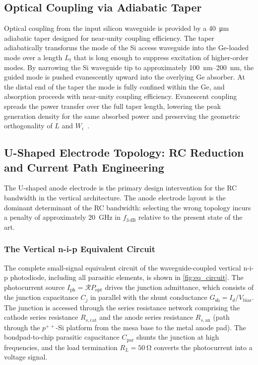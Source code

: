 \subsection[Optical Coupling via Adiabatic Taper]{Optical Coupling via Adiabatic Taper}
\label{subsec:pd_taper}

Optical coupling from the input silicon waveguide is provided by a
\SI{40}{\micro\metre} adiabatic taper designed for near-unity coupling
efficiency. The taper adiabatically transforms the mode of the Si access
waveguide into the Ge-loaded mode over a length $L_t$ that is long enough to
suppress excitation of higher-order modes. By narrowing the Si waveguide tip to
approximately \SIrange{100}{200}{\nano\metre}, the guided mode is pushed
evanescently upward into the overlying Ge absorber. At the distal end of the
taper the mode is fully confined within the Ge, and absorption proceeds with
near-unity coupling efficiency. Evanescent coupling spreads the power transfer
over the full taper length, lowering the peak generation density for the same
absorbed power and preserving the geometric orthogonality of $L$ and
$W_i$~\cite{Wang2024,Yan2024}.

\subsection[U-Shaped Electrode Topology]{U-Shaped Electrode Topology: RC Reduction and Current Path Engineering}
\label{subsec:pd_electrode}

The U-shaped anode electrode is the primary design intervention for the RC
bandwidth in the vertical architecture. The anode electrode layout is the
dominant determinant of the RC bandwidth: selecting the wrong topology incurs
a penalty of approximately \SI{20}{\giga\hertz} in $f_{3\,\mathrm{dB}}$ relative
to the present state of the art.

\subsubsection{The Vertical n-i-p Equivalent Circuit}
\label{subsubsec:pd_eqckt}

The complete small-signal equivalent circuit of the waveguide-coupled vertical
n-i-p photodiode, including all parasitic elements, is shown in
\cref{fig:eq_circuit}. The photocurrent source $I_{\mathrm{ph}}=\mathcal{R}P_{\mathrm{opt}}$
drives the junction admittance, which consists of the junction capacitance $C_j$
in parallel with the shunt conductance $G_{\mathrm{sh}}=I_d/V_{\mathrm{bias}}$.
The junction is accessed through the series resistance network comprising the
cathode series resistance $R_{s,\mathrm{cat}}$ and the anode series resistance
$R_{s,\mathrm{an}}$ (path through the $p^{++}$-Si platform from the mesa base to
the metal anode pad). The bondpad-to-chip parasitic capacitance $C_{\mathrm{par}}$
shunts the junction at high frequencies, and the load termination
$R_L=\SI{50}{\ohm}$ converts the photocurrent into a voltage signal.

